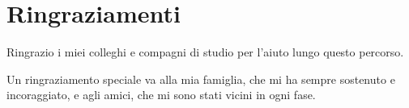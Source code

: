 \rhead[\fancyplain{}{\bfseries \leftmark}]{\fancyplain{}{\bfseries
\thepage}}

\clearpage{\pagestyle{empty}\cleardoublepage}
\chapter*{Ringraziamenti}
\thispagestyle{empty}
Ringrazio i miei colleghi e compagni di studio per l'aiuto lungo questo percorso.

Un ringraziamento speciale va alla mia famiglia, che mi ha sempre sostenuto e incoraggiato, e agli amici, che mi sono stati vicini in ogni fase.